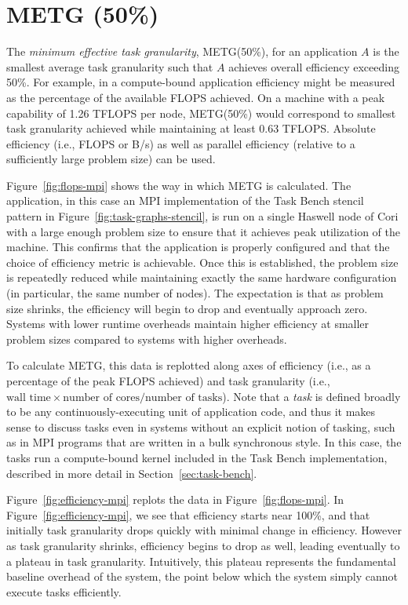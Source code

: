 \section{METG (50\%)}
\label{sec:metg}




The \emph{minimum effective task granularity}, METG(50\%), for an application $A$ is
the smallest average task granularity such that $A$
achieves overall efficiency exceeding 50\%. For example, in
a compute-bound application efficiency might be measured as the
percentage of the available FLOPS achieved. On a machine with a peak
capability of 1.26 TFLOPS per node, METG(50\%) would correspond to
smallest task granularity achieved while maintaining at least 0.63
TFLOPS. Absolute efficiency (i.e., FLOPS or B/s) as well
as parallel efficiency (relative to a sufficiently large problem size)
can be used.

Figure~\ref{fig:flops-mpi} shows the way in which METG is
calculated. The application, in this case an MPI implementation of the
Task Bench stencil pattern in Figure~\ref{fig:task-graphs-stencil}, is
run on a single Haswell node of Cori with a large enough problem size to
ensure that it achieves peak utilization of the machine. This confirms
that the application is properly configured and that the choice of
efficiency metric is achievable. Once this is established, the problem
size is repeatedly reduced while maintaining exactly the same hardware
configuration (in particular, the same number of nodes). The
expectation is that as problem size shrinks, the
efficiency will begin to drop and eventually approach zero. Systems
with lower runtime overheads maintain higher efficiency at smaller
problem sizes compared to systems with higher overheads.

To calculate METG, this data is replotted along axes of efficiency
(i.e., as a percentage of the peak FLOPS achieved) and task
granularity (i.e., $\text{wall time} \times \text{number of
  cores}/\text{number of tasks}$). Note that a \emph{task} is defined
broadly to be any continuously-executing unit of application code,
and thus it makes sense to discuss tasks even in systems
without an explicit notion of tasking, such as in MPI programs that
are written in a bulk synchronous style. In this case, the tasks run a
compute-bound kernel included in the Task Bench implementation,
described in more detail in Section~\ref{sec:task-bench}.

Figure~\ref{fig:efficiency-mpi} replots the data in
Figure~\ref{fig:flops-mpi}. In Figure~\ref{fig:efficiency-mpi}, we see that
efficiency starts near 100\%, and that initially task granularity
drops quickly with minimal change in efficiency. However as task
granularity shrinks, efficiency begins to drop as well, leading
eventually to a plateau in task granularity. Intuitively, this plateau
represents the fundamental baseline overhead of the system, the point
below which the system simply cannot execute tasks efficiently.

